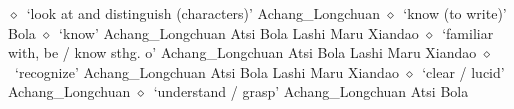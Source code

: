          $\diamond$~`look at and distinguish (characters)'
         Achang\_Longchuan 
\hspace{1ex}
         $\diamond$~`know (to write)'
         Bola 
\hspace{1ex}
         $\diamond$~`know'
         Achang\_Longchuan 
\hspace{1ex}
         Atsi 
\hspace{1ex}
         Bola 
\hspace{1ex}
         Lashi 
\hspace{1ex}
         Maru 
\hspace{1ex}
         Xiandao 
\hspace{1ex}
         $\diamond$~`familiar with, be / know sthg. o'
         Achang\_Longchuan 
\hspace{1ex}
         Atsi 
\hspace{1ex}
         Bola 
\hspace{1ex}
         Lashi 
\hspace{1ex}
         Maru 
\hspace{1ex}
         Xiandao 
\hspace{1ex}
         $\diamond$~`recognize'
         Achang\_Longchuan 
\hspace{1ex}
         Atsi 
\hspace{1ex}
         Bola 
\hspace{1ex}
         Lashi 
\hspace{1ex}
         Maru 
\hspace{1ex}
         Xiandao 
\hspace{1ex}
         $\diamond$~`clear / lucid'
         Achang\_Longchuan 
\hspace{1ex}
         $\diamond$~`understand / grasp'
         Achang\_Longchuan 
\hspace{1ex}
         Atsi 
\hspace{1ex}
         Bola 
\hspace{1ex}
